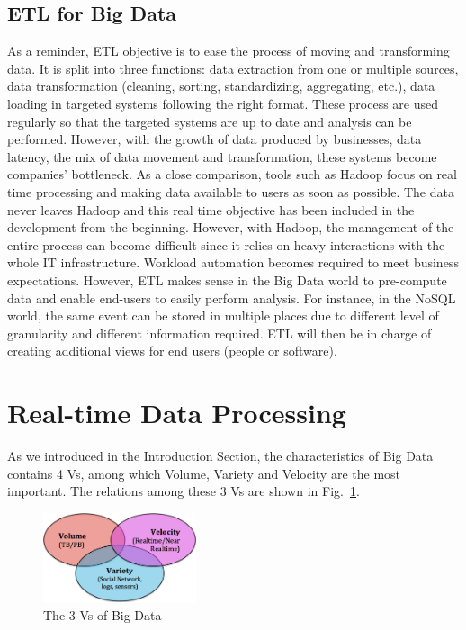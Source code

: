 \documentclass[	DIV=calc,%
							paper=a4,%
							fontsize=11pt,%
							twocolumn]{scrartcl}	 					%
\newcommand{\initial}[1]{%
     \lettrine[lines=3,lhang=0.3,nindent=0em]{
     				\color{DarkBlue}
     				{\textsf{#1}}}{}}
\begin{document}
\subsection*{ETL for Big Data}
As a reminder, ETL objective is to ease the process of moving and transforming data. It is split into three functions: data extraction from one or multiple sources, data transformation (cleaning, sorting, standardizing, aggregating, etc.), data loading in targeted systems following the right format. These process are used regularly so that the targeted systems are up to date and analysis can be performed. However, with the growth of data produced by businesses, data latency, the mix of data movement and transformation, these systems become companies’ bottleneck.
As a close comparison, tools such as Hadoop focus on real time processing and making data available to users as soon as possible. The data never leaves Hadoop and this real time objective has been included in the development from the beginning. However, with Hadoop, the management of the entire process can become difficult since it relies on heavy interactions with the whole IT infrastructure. Workload automation becomes required to meet business expectations.
However, ETL makes sense in the Big Data world to pre-compute data and enable end-users to easily perform analysis. For instance, in the NoSQL world, the same event can be stored in multiple places due to different level of granularity and different information required. ETL will then be in charge of creating additional views for end users (people or software).

\section*{\color{DarkOrange} Real-time Data Processing}

\initial{A}s we introduced in the Introduction Section, the characteristics of Big Data contains 4 Vs, among which Volume, Variety and Velocity are the most important. The relations among these 3 Vs are shown in Fig.~\ref{fig:3v}.

\begin{figure}
  \centering
    \includegraphics[width=0.4\textwidth]{images/3v.png}
    \caption{The 3 Vs of Big Data}
    \label{fig:3v}   
\end{figure}
\end{document}
